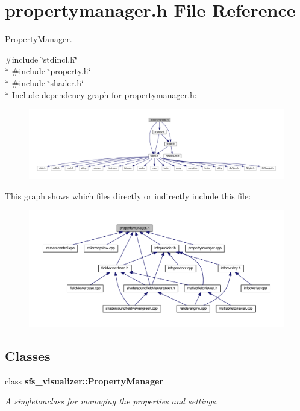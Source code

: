 \section{propertymanager.\-h File Reference}
\label{propertymanager_8h}


Property\-Manager.  


{\ttfamily \#include \char`\"{}stdincl.\-h\char`\"{}}\\*
{\ttfamily \#include \char`\"{}property.\-h\char`\"{}}\\*
{\ttfamily \#include \char`\"{}shader.\-h\char`\"{}}\\*
Include dependency graph for propertymanager.\-h\-:\nopagebreak
\begin{figure}[H]
\begin{center}
\leavevmode
\includegraphics[width=350pt]{d0/d41/propertymanager_8h__incl}
\end{center}
\end{figure}
This graph shows which files directly or indirectly include this file\-:\nopagebreak
\begin{figure}[H]
\begin{center}
\leavevmode
\includegraphics[width=350pt]{df/d5a/propertymanager_8h__dep__incl}
\end{center}
\end{figure}
\subsection*{Classes}
\begin{DoxyCompactItemize}
\item 
class {\bf sfs\-\_\-visualizer\-::\-Property\-Manager}
\begin{DoxyCompactList}\small\item\em A singletonclass for managing the properties and settings. \end{DoxyCompactList}\end{DoxyCompactItemize}

